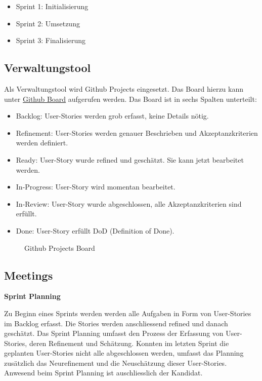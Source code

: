 \begin{itemize}
    \item Sprint 1: Initialisierung
    \item Sprint 2: Umsetzung
    \item Sprint 3: Finalisierung
\end{itemize}

\subsection{Verwaltungstool}
Als Verwaltungstool wird Github Projects eingesetzt. Das Board hierzu kann unter \href{https://github.com/users/Vakmeth/projects/3/views/1}{Github Board}
aufgerufen werden. Das Board ist in sechs Spalten unterteilt: 

\begin{itemize}
    \item Backlog: User-Stories werden grob erfasst, keine Details nötig.
    \item Refinement: User-Stories werden genauer Beschrieben und Akzeptanzkriterien werden definiert.
    \item Ready: User-Story wurde refined und geschätzt. Sie kann jetzt bearbeitet werden.
    \item In-Progress: User-Story wird momentan bearbeitet.
    \item In-Review: User-Story wurde abgeschlossen, alle Akzeptanzkriterien sind erfüllt.
    \item Done: User-Story erfüllt DoD (Definition of Done).
\end{itemize}

\begin{figure}[h]
    \centering
    \caption{Github Projects Board}
\end{figure}

\subsection{Meetings}
\textbf{Sprint Planning}

Zu Beginn eines Sprints werden werden alle Aufgaben in Form von User-Stories im Backlog erfasst.
Die Stories werden anschliessend refined und danach geschätzt. Das Sprint Planning umfasst den Prozess der Erfassung
von User-Stories, deren Refinement und Schätzung. Konnten im letzten Sprint die geplanten User-Stories nicht alle abgeschlossen werden,
umfasst das Planning zusätzlich das Neurefinement und die Neuschätzung dieser User-Stories. Anwesend beim Sprint Planning ist auschliesslich
der Kandidat.


